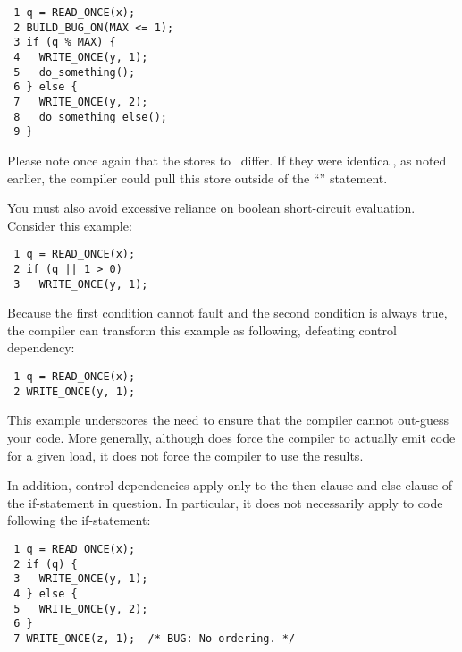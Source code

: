 \vspace{5pt}
\begin{minipage}[t]{\columnwidth}
\scriptsize
\begin{verbatim}
 1 q = READ_ONCE(x);
 2 BUILD_BUG_ON(MAX <= 1);
 3 if (q % MAX) {
 4   WRITE_ONCE(y, 1);
 5   do_something();
 6 } else {
 7   WRITE_ONCE(y, 2);
 8   do_something_else();
 9 }
\end{verbatim}
\end{minipage}
\vspace{5pt}

Please note once again that the stores to~ differ.
If they were identical, as noted earlier, the compiler could pull this
store outside of the ``'' statement.

You must also avoid excessive reliance on boolean short-circuit evaluation.
Consider this example:

\vspace{5pt}
\begin{minipage}[t]{\columnwidth}
\scriptsize
\begin{verbatim}
 1 q = READ_ONCE(x);
 2 if (q || 1 > 0)
 3   WRITE_ONCE(y, 1);
\end{verbatim}
\end{minipage}
\vspace{5pt}

Because the first condition cannot fault and the second condition is
always true, the compiler can transform this example as following,
defeating control dependency:

\vspace{5pt}
\begin{minipage}[t]{\columnwidth}
\scriptsize
\begin{verbatim}
 1 q = READ_ONCE(x);
 2 WRITE_ONCE(y, 1);
\end{verbatim}
\end{minipage}
\vspace{5pt}

This example underscores the need to ensure that the compiler cannot
out-guess your code.
More generally, although  does force
the compiler to actually emit code for a given load, it does not force
the compiler to use the results.

In addition, control dependencies apply only to the then-clause and
else-clause of the if-statement in question.
In particular, it does
not necessarily apply to code following the if-statement:

\vspace{5pt}
\begin{minipage}[t]{\columnwidth}
\scriptsize
\begin{verbatim}
 1 q = READ_ONCE(x);
 2 if (q) {
 3   WRITE_ONCE(y, 1);
 4 } else {
 5   WRITE_ONCE(y, 2);
 6 }
 7 WRITE_ONCE(z, 1);  /* BUG: No ordering. */
\end{verbatim}
\end{minipage}
\vspace{5pt}

